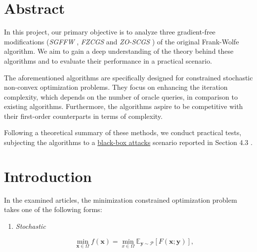  



\newpage

\begin{multicols}{2} %

\section*{Abstract}

In this project, our primary objective is to analyze three gradient-free modifications 
(\textit{SGFFW} \cite{sahu19a}, \textit{FZCGS} \cite{gao20b} and \textit{ZO-SCGS} \cite{lobanov2023})
of the original Frank-Wolfe algorithm. We aim to gain a deep understanding of 
the theory behind these algorithms and to evaluate their performance in a
practical scenario. 

The aforementioned algorithms are specifically designed for constrained 
stochastic non-convex optimization problems. They focus on enhancing the iteration complexity, 
which depends on the number of oracle queries, in comparison to existing algorithms. 
Furthermore, the algorithms aspire to be competitive with their first-order counterparts 
in terms of complexity.

Following a theoretical summary of these methods, we conduct practical tests, 
subjecting the algorithms to a \href{https://github.com/IBM/ZOSVRG-BlackBox-Adv}{black-box attacks} 
scenario reported in Section 4.3 \cite{gao20b}.



\section{Introduction}

In the examined articles, the minimization constrained optimization 
problem takes one of the following forms:

\begin{enumerate}
    \item \textit{Stochastic} 

    \begin{equation}
    \min _{\mathbf{x} \in \Omega} f(\mathbf{x})=\min _{x \in \Omega} \mathbb{E}_{\mathbf{y} \sim \mathcal{P}}[F(\mathbf{x} ; \mathbf{y})], 
    \label{eq:stochastic}
    \end{equation}


\end{enumerate}
\end{multicols}
